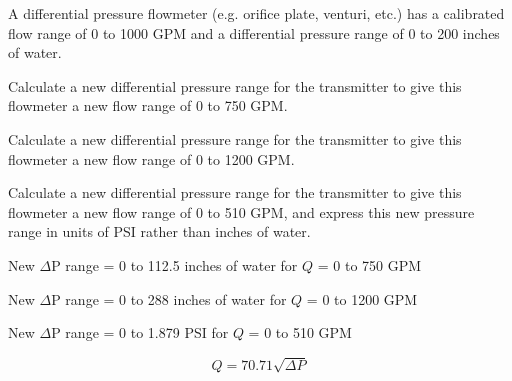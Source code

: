 

A differential pressure flowmeter (e.g. orifice plate, venturi, etc.) has a calibrated flow range of 0 to 1000 GPM and a differential pressure range of 0 to 200 inches of water.

\vskip 10pt

Calculate a new differential pressure range for the transmitter to give this flowmeter a new flow range of 0 to 750 GPM.

\vskip 10pt

Calculate a new differential pressure range for the transmitter to give this flowmeter a new flow range of 0 to 1200 GPM.

\vskip 10pt

Calculate a new differential pressure range for the transmitter to give this flowmeter a new flow range of 0 to 510 GPM, and express this new pressure range in units of PSI rather than inches of water.







New $\Delta$P range = 0 to 112.5 inches of water for $Q$ = 0 to 750 GPM

\vskip 10pt

New $\Delta$P range = 0 to 288 inches of water for $Q$ = 0 to 1200 GPM

\vskip 10pt

New $\Delta$P range = 0 to 1.879 PSI for $Q$ = 0 to 510 GPM







$$Q = 70.71 \sqrt{\Delta P}$$




